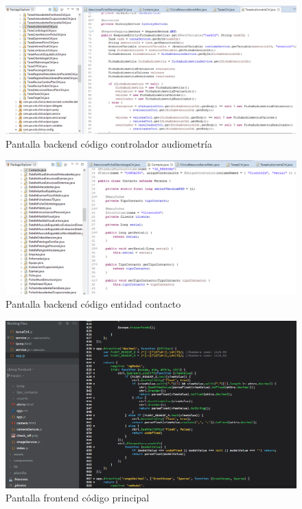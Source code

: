 	\begin{figure}[H]
	    \centering
		\includegraphics[width=18cm]{../imgs/codigo/back-ctrl.png}
		\caption{Pantalla backend código controlador audiometría}
		\label{figure:back-ctrl}
	\end{figure}
	
	
	\begin{figure}[H]
	    \centering
		\includegraphics[width=18cm]{../imgs/codigo/back-entity.png}
		\caption{Pantalla backend código entidad contacto}
		\label{figure:back-entity}
			\end{figure}
			
	\begin{figure}[H]
	    \centering
		\includegraphics[width=18cm]{../imgs/codigo/front-main.png}
		\caption{Pantalla frontend código principal}
		\label{figure:front-main}
	\end{figure}
	

